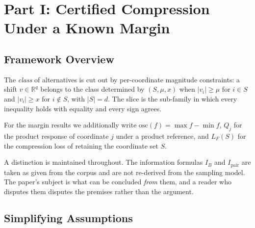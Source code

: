 \section{Part I: Certified Compression Under a Known Margin}

\label{sec:d6-setting}

\subsection{Framework Overview}

The \emph{class} of alternatives is cut out by per-coordinate magnitude constraints: a shift
$v\in\mathbb{R}^{q}$ belongs to the class determined by $(S,\mu,x)$ when $|v_{i}|\ge\mu$ for
$i\in S$ and $|v_{i}|\ge x$ for $i\notin S$, with $|S|=d$. The slice is the sub-family in
which every inequality holds with equality and every sign agrees.

For the margin results we additionally write $\mathrm{osc}(f)=\max f-\min f$, $Q_{j}$ for the
product response of coordinate $j$ under a product reference, and $L_{F}(S)$ for the
compression loss of retaining the coordinate set $S$.

A distinction is maintained throughout. The information formulas $I_{B}$ and
$I_{\mathrm{pair}}$ are taken as given from the corpus and are not re-derived from the
sampling model. The paper's subject is what can be concluded \emph{from} them, and a reader
who disputes them disputes the premises rather than the argument.

\subsection{Simplifying Assumptions}

